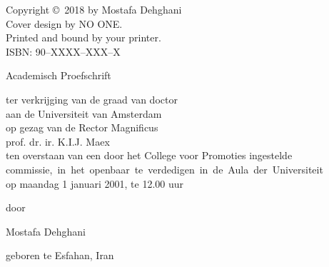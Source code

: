 {%
%

%
\noindent%
Copyright \copyright\ 2018 by Mostafa Dehghani\\[2ex] %
Cover design by NO ONE.\\                       %
Printed and bound by your printer.\\[2ex]           %
ISBN: 90--XXXX--XXX--X                              %



\clearpage
\par\vskip 2cm
\begin{center}
\printtitle
\par\vspace {6cm}
{\large \sc Academisch Proefschrift}
\par\vspace {1cm}
{\large ter verkrijging van de graad van doctor\\
aan de Universiteit van Amsterdam\\
op gezag van de Rector Magnificus\\
prof. dr. ir. K.I.J. Maex\\                                 %
ten overstaan van een door het College voor Promoties ingestelde\\
\mbox{commissie, in het openbaar te verdedigen in de Aula der Universiteit}\\        %
op maandag 1 januari 2001, te 12.00 uur \\ }        %
\par\vspace {1cm} {\large door}
\par \vspace {1cm} %
{\Large Mostafa Dehghani}                        %
\par\vspace {1cm} %
{\large geboren te Esfahan, Iran} %
\end{center}

}
